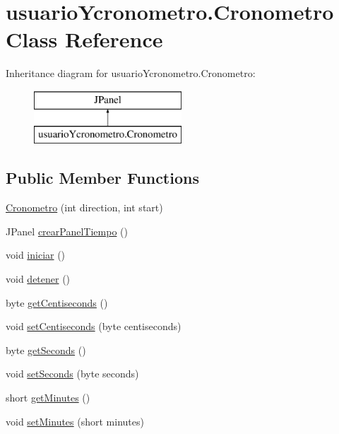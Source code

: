 \hypertarget{classusuario_ycronometro_1_1_cronometro}{}\section{usuario\+Ycronometro.\+Cronometro Class Reference}
\label{classusuario_ycronometro_1_1_cronometro}
Inheritance diagram for usuario\+Ycronometro.\+Cronometro\+:\begin{figure}[H]
\begin{center}
\leavevmode
\includegraphics[height=2.000000cm]{classusuario_ycronometro_1_1_cronometro}
\end{center}
\end{figure}
\subsection*{Public Member Functions}
\begin{DoxyCompactItemize}
\item 
\mbox{\hyperlink{classusuario_ycronometro_1_1_cronometro_aa0b668b611d70bd65f376a7997a6338e}{Cronometro}} (int direction, int start)
\item 
J\+Panel \mbox{\hyperlink{classusuario_ycronometro_1_1_cronometro_a547d646d18d0c96a957d505f205bcc9f}{crear\+Panel\+Tiempo}} ()
\item 
void \mbox{\hyperlink{classusuario_ycronometro_1_1_cronometro_a21acf83ac1cb483575be58233e9834b0}{iniciar}} ()
\item 
void \mbox{\hyperlink{classusuario_ycronometro_1_1_cronometro_a4880e5bf687c1bf0468b67f48b005cd3}{detener}} ()
\item 
byte \mbox{\hyperlink{classusuario_ycronometro_1_1_cronometro_a72a71422b16845d75149477c91d6db82}{get\+Centiseconds}} ()
\item 
void \mbox{\hyperlink{classusuario_ycronometro_1_1_cronometro_a8fe91a65391154d439dd2ac7038f28c2}{set\+Centiseconds}} (byte centiseconds)
\item 
byte \mbox{\hyperlink{classusuario_ycronometro_1_1_cronometro_aff5da858f72f40fe68151df21ea32134}{get\+Seconds}} ()
\item 
void \mbox{\hyperlink{classusuario_ycronometro_1_1_cronometro_a1af580bc1a16038f60d9ea245a265d7e}{set\+Seconds}} (byte seconds)
\item 
short \mbox{\hyperlink{classusuario_ycronometro_1_1_cronometro_afafafaca6cd25e07e93cb2e6986e1183}{get\+Minutes}} ()
\item 
void \mbox{\hyperlink{classusuario_ycronometro_1_1_cronometro_ad7952eb7b57978e58bced59ff1ae4504}{set\+Minutes}} (short minutes)
\end{DoxyCompactItemize}


